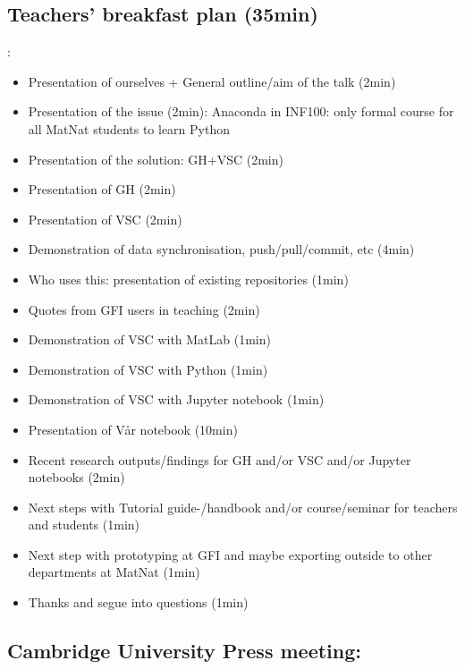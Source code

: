 \documentclass{article}
\begin{document}
\pagebreak

\subsection*{Teachers' breakfast plan (35min)}:

\begin{itemize}
    \item Presentation of ourselves + General outline/aim of the talk (2min)
    \item Presentation of the issue (2min): Anaconda in INF100: only formal course for all MatNat students to learn Python
    \item Presentation of the solution: GH+VSC (2min)
    \item Presentation of GH (2min)
    \item Presentation of VSC (2min)
    \item Demonstration of data synchronisation, push/pull/commit, etc (4min)
    \item Who uses this: presentation of existing repositories (1min)
    \item Quotes from GFI users in teaching (2min)
    \item Demonstration of VSC with MatLab (1min)
    \item Demonstration of VSC with Python (1min)
    \item Demonstration of VSC with Jupyter notebook (1min)
    \item Presentation of Vår notebook (10min)
    \item Recent research outputs/findings for GH and/or VSC and/or Jupyter notebooks (2min)
    \item Next steps with Tutorial guide-/handbook and/or course/seminar for teachers and students (1min)
    \item Next step with prototyping at GFI and maybe exporting outside to other departments at MatNat (1min)
    \item Thanks and segue into questions (1min)
\end{itemize}

\pagebreak

\subsection*{Cambridge University Press meeting:}
\end{document}
